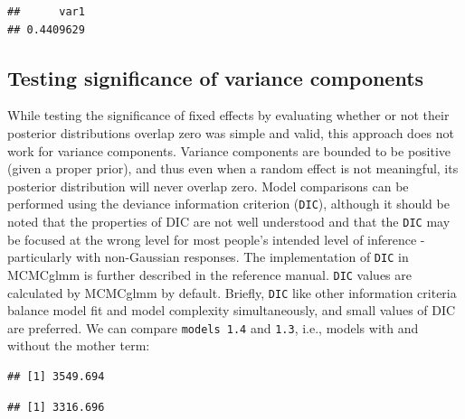 \documentclass[
  12pt,
]{book}
\newenvironment{Shaded}{\begin{snugshade}}{\end{snugshade}}
\newcommand{\FloatTok}[1]{\textcolor[rgb]{0.00,0.00,0.81}{#1}}
\newcommand{\NormalTok}[1]{#1}
\newcommand{\SpecialCharTok}[1]{\textcolor[rgb]{0.00,0.00,0.00}{#1}}
\begin{document}
\begin{verbatim}
##      var1 
## 0.4409629
\end{verbatim}

\hypertarget{testing-significance-of-variance-components}{%
\subsection{Testing significance of variance components}\label{testing-significance-of-variance-components}}

While testing the significance of fixed effects by evaluating whether or not their posterior distributions overlap zero was simple and valid, this approach does not work for variance components.
Variance components are bounded to be positive (given a proper prior), and thus even when a random effect is not meaningful, its posterior distribution will never overlap zero. Model comparisons can be performed using the deviance information criterion (\texttt{DIC}), although it should be noted that the properties of DIC are not well understood and that the \texttt{DIC} may be focused at the wrong level for most people's intended level of inference - particularly with non-Gaussian responses. The implementation of \texttt{DIC} in MCMCglmm is further described in the reference manual. \texttt{DIC} values are calculated by MCMCglmm by default. Briefly, \texttt{DIC} like other information criteria balance model fit and model complexity simultaneously, and small values of DIC are preferred. We can compare \texttt{models\ 1.4} and \texttt{1.3}, i.e., models with and without the mother term:

\begin{Shaded}
\end{Shaded}

\begin{verbatim}
## [1] 3549.694
\end{verbatim}

\begin{Shaded}
\end{Shaded}

\begin{verbatim}
## [1] 3316.696
\end{verbatim}
\end{document}
